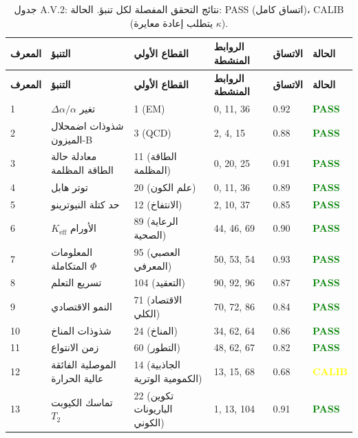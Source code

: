 \documentclass[13pt,a4paper]{article}
\begin{document}
	\begin{longtable}{|p{0.8cm}|p{2.5cm}|p{1.8cm}|p{1.5cm}|p{1.5cm}|p{1.8cm}|}
		\caption{جدول A.V.2: نتائج التحقق المفصلة لكل تنبؤ. الحالة: PASS (اتساق كامل)، CALIB (يتطلب إعادة معايرة $\kappa$).}
		\label{tab:detailed-validation} \\
		\hline
		\textbf{المعرف} & \textbf{التنبؤ} & \textbf{القطاع الأولي} & \textbf{الروابط المنشطة} & \textbf{الاتساق} & \textbf{الحالة} \\
		\hline
		\endfirsthead
		\hline
		\textbf{المعرف} & \textbf{التنبؤ} & \textbf{القطاع الأولي} & \textbf{الروابط المنشطة} & \textbf{الاتساق} & \textbf{الحالة} \\
		\hline
		\endhead
		1 & $\Delta\alpha/\alpha$ تغير & 1 (EM) & 0, 11, 36 & 0.92 & \textcolor{green}{\textbf{PASS}} \\
		\hline
		2 & شذوذات اضمحلال الميزون-B & 3 (QCD) & 2, 4, 15 & 0.88 & \textcolor{green}{\textbf{PASS}} \\
		\hline
		3 & معادلة حالة الطاقة المظلمة & 11 (الطاقة المظلمة) & 0, 20, 25 & 0.91 & \textcolor{green}{\textbf{PASS}} \\
		\hline
		4 & توتر هابل & 20 (علم الكون) & 0, 11, 36 & 0.89 & \textcolor{green}{\textbf{PASS}} \\
		\hline
		5 & حد كتلة النيوترينو & 12 (الانتفاخ) & 2, 10, 37 & 0.85 & \textcolor{green}{\textbf{PASS}} \\
		\hline
		6 & $K_{\mathrm{eff}}$ الأورام & 89 (الرعاية الصحية) & 44, 46, 69 & 0.90 & \textcolor{green}{\textbf{PASS}} \\
		\hline
		7 & المعلومات المتكاملة $\Phi$ & 95 (العصبي المعرفي) & 50, 53, 54 & 0.93 & \textcolor{green}{\textbf{PASS}} \\
		\hline
		8 & تسريع التعلم & 104 (التعقيد) & 90, 92, 96 & 0.87 & \textcolor{green}{\textbf{PASS}} \\
		\hline
		9 & النمو الاقتصادي & 71 (الاقتصاد الكلي) & 70, 72, 86 & 0.84 & \textcolor{green}{\textbf{PASS}} \\
		\hline
		10 & شذوذات المناخ & 24 (المناخ) & 34, 62, 64 & 0.86 & \textcolor{green}{\textbf{PASS}} \\
		\hline
		11 & زمن الانتواع & 60 (التطور) & 48, 62, 67 & 0.82 & \textcolor{green}{\textbf{PASS}} \\
		\hline
		12 & الموصلية الفائقة عالية الحرارة & 14 (الجاذبية الكمومية الوترية) & 13, 15, 68 & 0.68 & \textcolor{yellow}{\textbf{CALIB}} \\
		\hline
		13 & تماسك الكيوبت $T_2$ & 22 (تكوين الباريونات الكوني) & 1, 13, 104 & 0.91 & \textcolor{green}{\textbf{PASS}} \\

\end{longtable}
\end{document}

